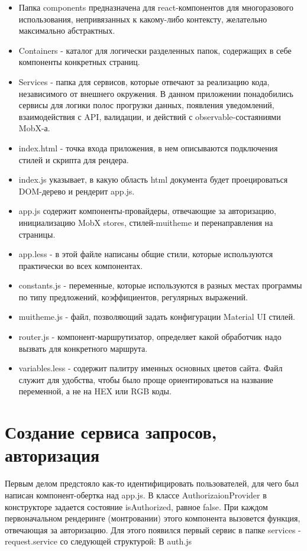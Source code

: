 \documentclass[a4paper,12pt]{diplom}
\begin{document}
\begin{itemize}
  \item Папка components предназначена для react-компонентов для многоразового использования, непривязанных к какому-либо контексту, желательно максимально абстрактных.
  \item Containers - каталог для логически разделенных папок, содержащих в себе компоненты конкретных страниц.
  \item Services - папка для сервисов, которые отвечают за реализацию кода, независимого от внешнего окружения. В данном приложении понадобились сервисы для логики полос прогрузки данных, появления уведомлений, взаимодействия с API, валидации, и действий с observable-состаяниями MobX-а.
  \item index.html - точка входа приложения, в нем описываются подключения стилей и скрипта для рендера.
  \item index.js указывает, в какую область html документа будет проецироваться DOM-дерево и рендерит app.js.
  \item app.js содержит компоненты-провайдеры, отвечающие за авторизацию, инициализацию MobX stores, стилей-muitheme и перенаправления на страницы.
  \item app.less - в этой файле написаны общие стили, которые используются практически во всех компонентах.
  \item constants.js - переменные, которые используются в разных местах программы по типу предложений, коэффициентов, регулярных выражений.
  \item muitheme.js - файл, позволяющий задать конфигурации Material UI стилей.
  \item router.js - компонент-маршрутизатор, определяет какой обработчик надо вызвать для конкретного маршрута.
  \item variables.less - содержит палитру именных основных цветов сайта. Файл служит для удобства, чтобы было проще ориентироваться на название переменной, а не на HEX или RGB коды.
\end{itemize}

\section{Создание сервиса запросов, авторизация}

Первым делом предстояло как-то идентифицировать пользователей, для чего был написан компонент-обертка над app.js.
\medskip
В классе AuthorizaionProvider в конструкторе задается состояние isAuthorized, равное false. При каждом первоначальном рендеринге (монтровании) этого компонента
вызовется функция, отвечающая за авторизацию. Для этого появился первый сервис в папке services - request.service со следующей структурой: 
\medskip
{}
В auth.js 
\end{document}
